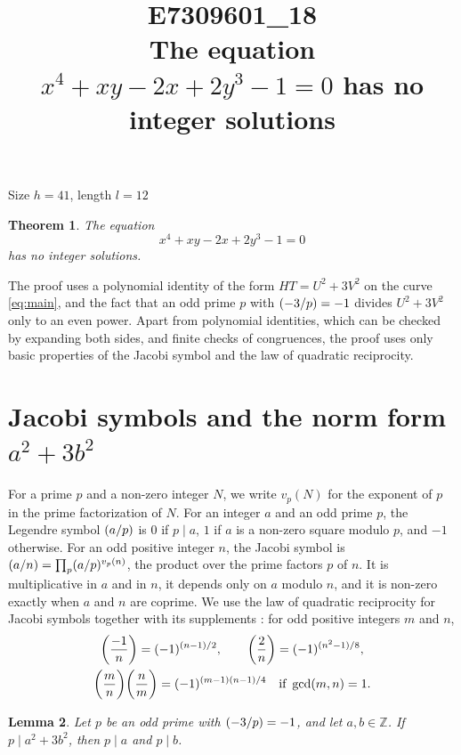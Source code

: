 \documentclass[11pt]{article}
\title{\textbf{E7309601\_18}\\[4pt] {\Large The equation $x^{4}+xy-2x+2y^{3}-1=0$ has no integer solutions}}
\author{}
\date{}
\newtheorem{theorem}{Theorem}
\newtheorem{lemma}[theorem]{Lemma}
\newcommand{\Z}{\mathbb{Z}}
\newcommand{\leg}[2]{\mathchoice{\biggl(\dfrac{#1}{#2}\biggr)}{(#1/#2)}{(#1/#2)}{(#1/#2)}}
\begin{document}
\maketitle
\vspace{-8ex}
\begin{center}
Size $h=41$, length $l=12$
\end{center}

\begin{theorem}\label{thm:main}
The equation
\begin{equation}\label{eq:main}
x^{4}+xy-2x+2y^{3}-1=0
\end{equation}
has no integer solutions.
\end{theorem}

The proof uses a polynomial identity of the form $HT=U^2+3V^2$ on the curve \eqref{eq:main}, and the fact that an odd prime $p$ with $\leg{-3}{p}=-1$ divides $U^2+3V^2$ only to an even power. Apart from polynomial identities, which can be checked by expanding both sides, and finite checks of congruences, the proof uses only basic properties of the Jacobi symbol and the law of quadratic reciprocity.

\section{\texorpdfstring{Jacobi symbols and the norm form $a^2+3b^2$}{Jacobi symbols and the norm form}}

For a prime $p$ and a non-zero integer $N$, we write $v_p(N)$ for the exponent of $p$ in the prime factorization of $N$. For an integer $a$ and an odd prime $p$, the Legendre symbol $\leg{a}{p}$ is $0$ if $p\mid a$, $1$ if $a$ is a non-zero square modulo $p$, and $-1$ otherwise. For an odd positive integer $n$, the Jacobi symbol is $\leg{a}{n}=\prod_p\leg{a}{p}^{v_p(n)}$, the product over the prime factors $p$ of $n$. It is multiplicative in $a$ and in $n$, it depends only on $a$ modulo $n$, and it is non-zero exactly when $a$ and $n$ are coprime. We use the law of quadratic reciprocity for Jacobi symbols together with its supplements \cite[Chapter~5, \S2]{IR}: for odd positive integers $m$ and $n$,
\begin{gather*}
\leg{-1}{n}=(-1)^{(n-1)/2},\qquad\leg{2}{n}=(-1)^{(n^2-1)/8},\\
\leg{m}{n}\leg{n}{m}=(-1)^{(m-1)(n-1)/4}\quad\text{if }\gcd(m,n)=1.
\end{gather*}

\begin{lemma}\label{lem:divides}
Let $p$ be an odd prime with $\leg{-3}{p}=-1$, and let $a,b\in\Z$. If $p\mid a^2+3b^2$, then $p\mid a$ and $p\mid b$.
\end{lemma}
\end{document}
